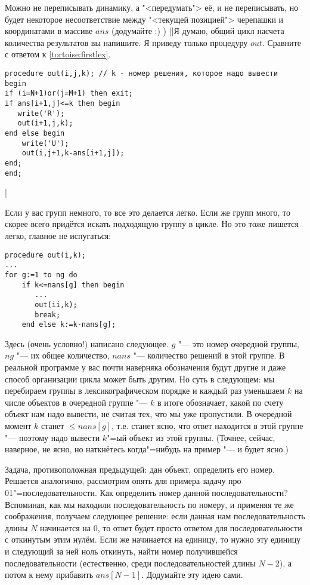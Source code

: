 Можно не переписывать динамику, а "<передумать"> её, и не переписывать, но будет некоторое 
несоответствие между "<текущей позицией"> черепашки и координатами в массиве $ans$ (додумайте :) )
||Я думаю, общий цикл насчета количества результатов вы напишите. Я приведу только процедуру $out$. 
Сравните с ответом к \ref{tortoise:firstlex}.
\begin{codesampleo}\begin{verbatim}
procedure out(i,j,k); // k - номер решения, которое надо вывести
begin
if (i=N+1)or(j=M+1) then exit;
if ans[i+1,j]<=k then begin
   write('R');
   out(i+1,j,k);
end else begin
    write('U');
    out(i,j+1,k-ans[i+1,j]);
end;
end;
\end{verbatim}
\end{codesampleo}
|\label{tortoise:kth}


Если у вас групп немного, то все это делается легко. Если же групп много, то скорее всего
придётся искать подходящую группу в цикле. Но это тоже пишется легко, главное не испугаться:
\begin{codesampleo}\begin{verbatim}
procedure out(i,k);
...
for g:=1 to ng do
    if k<=nans[g] then begin
       ...
       out(ii,k);
       break;
    end else k:=k-nans[g];
\end{verbatim}
\end{codesampleo}
Здесь (очень условно!) написано следующее. $g$ "--- это номер очередной группы, $ng$ "--- их
общее количество, $nans$ "--- количество решений в этой группе. В реальной программе у вас
почти наверняка обозначения будут другие и даже способ организации цикла может быть другим.
Но суть в следующем: мы перебираем группы в лексикографическом порядке и каждый раз уменьшаем 
$k$ на числе объектов в очередной группе "--- $k$ в итоге обозначает,
какой по счету объект нам надо вывести, не считая тех, что мы уже пропустили. В очередной
момент $k$ станет $\leq nans[g]$, т.е. станет ясно, что ответ находится в этой группе "---
поэтому надо вывести $k$"=ый объект из этой группы. (Точнее, сейчас, наверное, не ясно,
но наткнётесь когда"=нибудь на пример "--- и будет ясно.)

 Задача, противоположная предыдущей: дан объект, определить 
его номер. Решается аналогично, рассмотрим опять для примера задачу про 01"=последовательности. Как 
определить номер данной последовательности? Вспоминая, как мы находили последовательность по 
номеру, и применяя те же соображения, получаем следующее решение: если данная нам 
последовательность длины $N$ начинается на 0, то ответ будет просто ответом для последовательности с 
откинутым этим нулём. Если же начинается на единицу, то нужно эту единицу и следующий за ней ноль 
откинуть, найти номер получившейся последовательности (естественно, среди последовательностей длины 
$N-2$), а потом к нему прибавить $ans[N-1]$. Додумайте эту идею сами.

